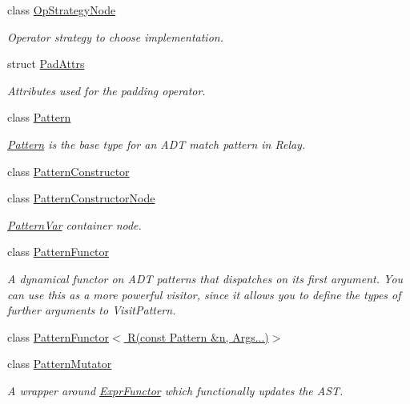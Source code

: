 \begin{DoxyCompactItemize}
class \hyperlink{classtvm_1_1relay_1_1OpStrategyNode}{Op\+Strategy\+Node}
\begin{DoxyCompactList}\small\item\em Operator strategy to choose implementation. \end{DoxyCompactList}\item 
struct \hyperlink{structtvm_1_1relay_1_1PadAttrs}{Pad\+Attrs}
\begin{DoxyCompactList}\small\item\em Attributes used for the padding operator. \end{DoxyCompactList}\item 
class \hyperlink{classtvm_1_1relay_1_1Pattern}{Pattern}
\begin{DoxyCompactList}\small\item\em \hyperlink{classtvm_1_1relay_1_1Pattern}{Pattern} is the base type for an A\+DT match pattern in Relay. \end{DoxyCompactList}\item 
class \hyperlink{classtvm_1_1relay_1_1PatternConstructor}{Pattern\+Constructor}
\item 
class \hyperlink{classtvm_1_1relay_1_1PatternConstructorNode}{Pattern\+Constructor\+Node}
\begin{DoxyCompactList}\small\item\em \hyperlink{classtvm_1_1relay_1_1PatternVar}{Pattern\+Var} container node. \end{DoxyCompactList}\item 
class \hyperlink{classtvm_1_1relay_1_1PatternFunctor}{Pattern\+Functor}
\begin{DoxyCompactList}\small\item\em A dynamical functor on A\+DT patterns that dispatches on its first argument. You can use this as a more powerful visitor, since it allows you to define the types of further arguments to Visit\+Pattern. \end{DoxyCompactList}\item 
class \hyperlink{classtvm_1_1relay_1_1PatternFunctor_3_01R_07const_01Pattern_01_6n_00_01Args_8_8_8_08_4}{Pattern\+Functor$<$ R(const Pattern \&n, Args...)$>$}
\item 
class \hyperlink{classtvm_1_1relay_1_1PatternMutator}{Pattern\+Mutator}
\begin{DoxyCompactList}\small\item\em A wrapper around \hyperlink{classtvm_1_1relay_1_1ExprFunctor}{Expr\+Functor} which functionally updates the A\+ST. \end{DoxyCompactList}\item 

\end{DoxyCompactItemize}
